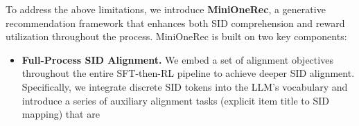 To address the above limitations, we introduce \textbf{MiniOneRec}, a generative recommendation framework that
enhances both SID comprehension and reward utilization throughout the  process.
MiniOneRec is built on two key components:  
\begin{itemize}[leftmargin=*]
    \item \textbf{Full-Process SID Alignment.} 
    We embed a set of alignment objectives throughout the entire SFT-then-RL pipeline to achieve deeper SID alignment. 
    Specifically, we integrate discrete SID tokens into the LLM's vocabulary and introduce a series of auxiliary alignment tasks (\eg explicit item title to SID mapping) that are  
        

\end{itemize}
